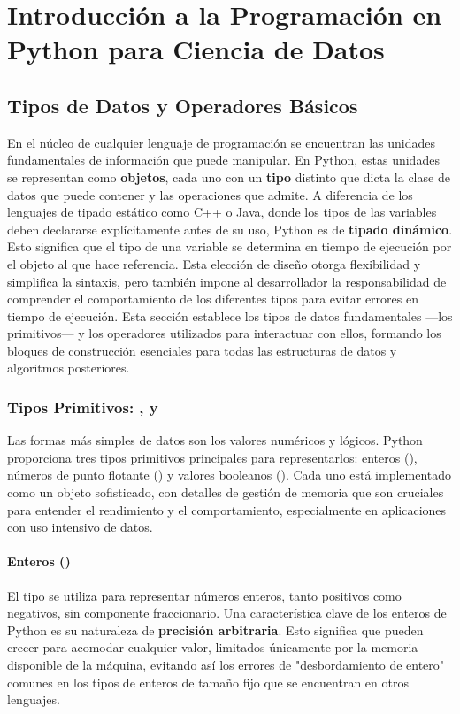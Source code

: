 \chapter{Introducción a la Programación en Python para Ciencia de Datos}
\label{chap:python_intro}

\section{Tipos de Datos y Operadores Básicos}
\label{sec:data_types_operators}

En el núcleo de cualquier lenguaje de programación se encuentran las unidades fundamentales de información que puede manipular. En Python, estas unidades se representan como \textbf{objetos}, cada uno con un \textbf{tipo} distinto que dicta la clase de datos que puede contener y las operaciones que admite. A diferencia de los lenguajes de tipado estático como C++ o Java, donde los tipos de las variables deben declararse explícitamente antes de su uso, Python es de \textbf{tipado dinámico}. Esto significa que el tipo de una variable se determina en tiempo de ejecución por el objeto al que hace referencia. Esta elección de diseño otorga flexibilidad y simplifica la sintaxis, pero también impone al desarrollador la responsabilidad de comprender el comportamiento de los diferentes tipos para evitar errores en tiempo de ejecución. Esta sección establece los tipos de datos fundamentales —los primitivos— y los operadores utilizados para interactuar con ellos, formando los bloques de construcción esenciales para todas las estructuras de datos y algoritmos posteriores.

\subsection{Tipos Primitivos: ,  y }
\label{subsec:primitive_types}
Las formas más simples de datos son los valores numéricos y lógicos. Python proporciona tres tipos primitivos principales para representarlos: enteros (), números de punto flotante () y valores booleanos (). Cada uno está implementado como un objeto sofisticado, con detalles de gestión de memoria que son cruciales para entender el rendimiento y el comportamiento, especialmente en aplicaciones con uso intensivo de datos.

\subsubsection*{Enteros ()}
El tipo  se utiliza para representar números enteros, tanto positivos como negativos, sin componente fraccionario. Una característica clave de los enteros de Python es su naturaleza de \textbf{precisión arbitraria}. Esto significa que pueden crecer para acomodar cualquier valor, limitados únicamente por la memoria disponible de la máquina, evitando así los errores de "desbordamiento de entero" comunes en los tipos de enteros de tamaño fijo que se encuentran en otros lenguajes.

